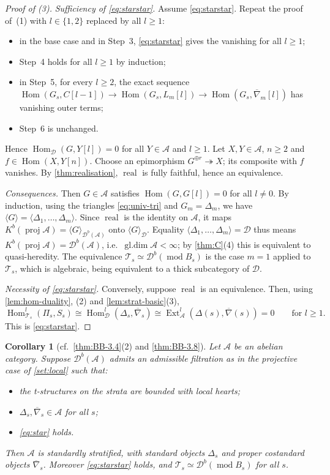 \documentclass[11pt,reqno]{amsart}
\theoremstyle{plain}
\newtheorem{corollary}[theorem]{Corollary}
\theoremstyle{definition}
\theoremstyle{remark}
\DeclareMathOperator{\Hom}{Hom}
\DeclareMathOperator{\Ext}{Ext}
\DeclareMathOperator{\real}{real}
\DeclareMathOperator{\gldim}{gl.dim}
\newcommand{\modd}{\operatorname{mod}}
\newcommand{\proj}{\operatorname{proj}}
\newcommand{\Db}{\mathcal{D}^b}
\newcommand{\Kb}{K^b}
\newcommand{\thick}[1]{\langle #1\rangle}
\newcommand{\nablabar}{\overline{\nabla}}
\newcommand{\cD}{\mathcal{D}}
\newcommand{\cA}{\mathcal{A}}
\newcommand{\cT}{\mathcal{T}}
\begin{document}
\begin{proof}[Proof of \textup{(3)}]
\emph{Sufficiency of \eqref{eq:starstar}.} Assume \eqref{eq:starstar}. Repeat the proof of~(1) with $l\in\{1,2\}$ replaced by all $l\ge1$:
\begin{itemize}
\item in the base case and in Step~3, \eqref{eq:starstar} gives the vanishing for all $l\ge1$;
\item Step~4 holds for all $l\ge1$ by induction;
\item in Step~5, for every $l\ge2$, the exact sequence $\Hom(G_s,C[l-1])\to\Hom(G_s,L_m[l])\to\Hom(G_s,\nablabar_m[l])$ has vanishing outer terms;
\item Step~6 is unchanged.
\end{itemize}
Hence $\Hom_\cD(G,Y[l])=0$ for all $Y\in\cA$ and $l\ge1$. Let $X,Y\in\cA$, $n\ge2$ and $f\in\Hom(X,Y[n])$. Choose an epimorphism $G^{\oplus r}\twoheadrightarrow X$; its composite with $f$ vanishes. By \cref{thm:realisation}, $\real$ is fully faithful, hence an equivalence.

\emph{Consequences.} Then $G\in\cA$ satisfies $\Hom(G,G[l])=0$ for all $l\ne0$. By induction, using the triangles \eqref{eq:univ-tri} and $G_m=\Delta_m$, we have $\thick G=\thick{\Delta_1,\dots,\Delta_m}$. Since $\real$ is the identity on $\cA$, it maps $\Kb(\proj\cA)=\thick{G}_{\Db(\cA)}$ onto $\thick G_\cD$. Equality $\thick{\Delta_1,\dots,\Delta_m}=\cD$ thus means $\Kb(\proj\cA)=\Db(\cA)$, i.e.\ $\gldim\cA<\infty$; by \cref{thm:C}(4) this is equivalent to quasi-heredity. The equivalence $\cT_s\simeq\Db(\modd B_s)$ is the case $m=1$ applied to $\cT_s$, which is algebraic, being equivalent to a thick subcategory of $\cD$.

\emph{Necessity of \eqref{eq:starstar}.} Conversely, suppose $\real$ is an equivalence. Then, using \cref{lem:hom-duality}, (2) and \cref{lem:strat-basic}(3),
\[\Hom^l_{\cT_s}(\Pi_s,S_s)\cong\Hom^l_\cD(\Delta_s,\nablabar_s)\cong\Ext^l_\cA(\Delta(s),\nablabar(s))=0\qquad\text{for }l\ge1.\]
This is \eqref{eq:starstar}.
\end{proof}

\begin{corollary}[cf.\ {\cref{thm:BB-3.4}(2)} and {\cref{thm:BB-3.8}}]\label{cor:forward}
Let $\cA$ be an abelian category. Suppose $\Db(\cA)$ admits an admissible filtration as in the projective case of \cref{set:local} such that:
\begin{itemize}
\item the t-structures on the strata are bounded with local hearts;
\item $\Delta_s,\nablabar_s\in\cA$ for all $s$;
\item \eqref{eq:star} holds.
\end{itemize}
Then $\cA$ is standardly stratified, with standard objects $\Delta_s$ and proper costandard objects $\nablabar_s$. Moreover \eqref{eq:starstar} holds, and $\cT_s\simeq\Db(\modd B_s)$ for all $s$.
\end{corollary}
\end{document}
